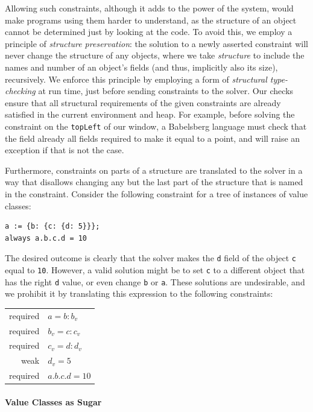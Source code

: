 Allowing such constraints, although it adds to the power of the
system, would make programs using them harder to understand, as the
structure of an object cannot be determined just by looking at the
code. To avoid this, we employ a principle of \emph{structure
  preservation}: the solution to a newly asserted constraint will
never change the structure of any objects, where we take
\emph{structure} to include the names and number of an object's fields
(and thus, implicitly also its size), recursively.  We enforce this
principle by employing a form of \emph{structural type-checking} at
run time, just before sending constraints to the solver. Our checks
ensure that all structural requirements of the given constraints are
already satisfied in the current environment and heap.  For example,
before solving the constraint on the \verb!topLeft! of our window, a
Babelsberg language must check that the field already all fields
required to make it equal to a point, and will raise an exception if
that is not the case.

Furthermore, constraints on parts of a structure are translated to the
solver in a way that disallows changing any but the last part of the
structure that is named in the constraint. Consider the following
constraint for a tree of instances of value classes:
\begin{lstlisting}
a := {b: {c: {d: 5}}};
always a.b.c.d = 10
\end{lstlisting}
The desired outcome is clearly that the solver makes the \verb!d!
field of the object \verb!c! equal to \verb!10!. However, a valid
solution might be to set \verb!c! to a different object that has the
right \verb!d! value, or even change \verb!b! or \verb!a!. These
solutions are undesirable, and we prohibit it by translating this
expression to the following constraints:
\begin{center}
\begin{tabular}{rl}
  required & $a = {b: b_v}$ \\
  required & $b_v = {c: c_v}$ \\
  required & $c_v = {d: d_v}$ \\
  weak & $d_v = 5$ \\
  required & $a.b.c.d = 10$ \\
\end{tabular}
\end{center}

\paragraph*{Value Classes as Sugar}
\label{sec:value-classes-as-syntactic-sugar}

